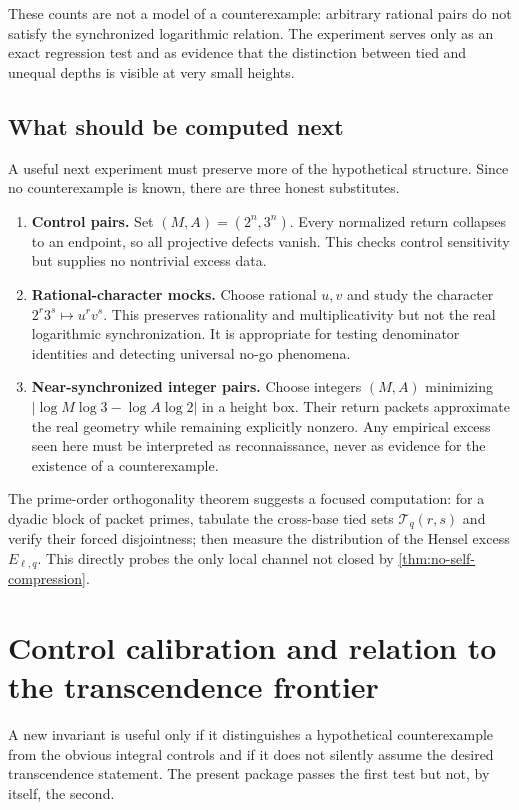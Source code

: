 \documentclass[11pt]{article}
\theoremstyle{definition}
\theoremstyle{remark}
\begin{document}
These counts are not a model of a counterexample: arbitrary rational pairs do not satisfy the synchronized logarithmic relation.  The experiment serves only as an exact regression test and as evidence that the distinction between tied and unequal depths is visible at very small heights.

\subsection{What should be computed next}

A useful next experiment must preserve more of the hypothetical structure.  Since no counterexample is known, there are three honest substitutes.

\begin{enumerate}
\item \textbf{Control pairs.}  Set $(M,A)=(2^n,3^n)$.  Every normalized return collapses to an endpoint, so all projective defects vanish.  This checks control sensitivity but supplies no nontrivial excess data.
\item \textbf{Rational-character mocks.}  Choose rational $u,v$ and study the character $2^r3^s\mapsto u^rv^s$.  This preserves rationality and multiplicativity but not the real logarithmic synchronization.  It is appropriate for testing denominator identities and detecting universal no-go phenomena.
\item \textbf{Near-synchronized integer pairs.}  Choose integers $(M,A)$ minimizing $|\log M\log3-\log A\log2|$ in a height box.  Their return packets approximate the real geometry while remaining explicitly nonzero.  Any empirical excess seen here must be interpreted as reconnaissance, never as evidence for the existence of a counterexample.
\end{enumerate}

The prime-order orthogonality theorem suggests a focused computation: for a dyadic block of packet primes, tabulate the cross-base tied sets $\mathcal T_q(r,s)$ and verify their forced disjointness; then measure the distribution of the Hensel excess $E_{\ell,q}$.  This directly probes the only local channel not closed by \cref{thm:no-self-compression}.

\section{Control calibration and relation to the transcendence frontier}
\label{sec:calibration}

A new invariant is useful only if it distinguishes a hypothetical counterexample from the obvious integral controls and if it does not silently assume the desired transcendence statement.  The present package passes the first test but not, by itself, the second.
\end{document}
